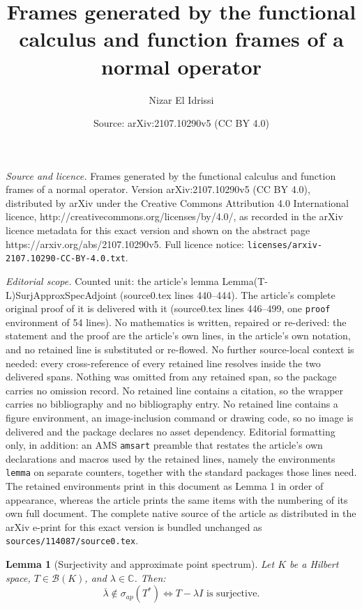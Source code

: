 \documentclass[10pt,a4paper]{amsart}
\title{Frames generated by the functional calculus and function frames of a normal operator}
\author{Nizar El Idrissi}
\date{Source: arXiv:2107.10290v5 (CC BY 4.0)}
\newtheorem{lemma}{Lemma}
\begin{document}
\maketitle

\noindent\emph{Source and licence.} Frames generated by the functional calculus and function frames of a normal operator. Version arXiv:2107.10290v5 (CC BY 4.0), distributed by arXiv under the Creative Commons Attribution 4.0 International licence, http://creativecommons.org/licenses/by/4.0/, as recorded in the arXiv licence metadata for this exact version and shown on the abstract page https://arxiv.org/abs/2107.10290v5. Full licence notice: \texttt{licenses/arxiv-2107.10290-CC-BY-4.0.txt}.\par\smallskip

\noindent\textit{Editorial scope.} Counted unit: the article's lemma Lemma(T-L)SurjApproxSpecAdjoint (source0.tex lines 440--444). The article's complete original proof of it is delivered with it (source0.tex lines 446--499, one \texttt{proof} environment of 54 lines). No mathematics is written, repaired or re-derived: the statement and the proof are the article's own lines, in the article's own notation, and no retained line is substituted or re-flowed.  No further source-local context is needed: every cross-reference of every retained line resolves inside the two delivered spans.  Nothing was omitted from any retained span, so the package carries no omission record.  No retained line contains a citation, so the wrapper carries no bibliography and no bibliography entry.  No retained line contains a figure environment, an image-inclusion command or drawing code, so no image is delivered and the package declares no asset dependency.  Editorial formatting only, in addition: an AMS \texttt{amsart} preamble that restates the article's own declarations and macros used by the retained lines, namely the environments \texttt{lemma} on separate counters, together with the standard packages those lines need.  The retained environments print in this document as Lemma 1 in order of appearance, whereas the article prints the same items with the numbering of its own full document.  The complete native source of the article as distributed in the arXiv e-print for this exact version is bundled unchanged as \texttt{sources/114087/source0.tex}.
\begin{lemma}[Surjectivity and approximate point spectrum]
\label{Lemma(T-L)SurjApproxSpecAdjoint}
Let $K$ be a Hilbert space, $T \in \mathcal{B}(K)$, and $\lambda \in \mathbb{C}$. Then:
\[\overline{\lambda} \notin \sigma_{ap}(T^*) \Leftrightarrow T - \lambda I \text{ is surjective}.\]
\end{lemma}
\end{document}
